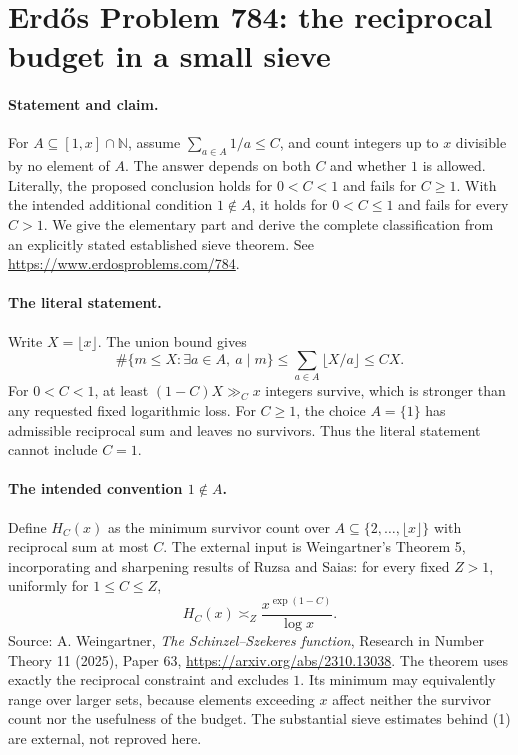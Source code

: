 \section*{Erd\H{o}s Problem 784: the reciprocal budget in a small sieve}

\paragraph{Statement and claim.}
For \(A\subseteq[1,x]\cap\mathbb N\), assume
\(\sum_{a\in A}1/a\leq C\), and count integers up to \(x\)
divisible by no element of \(A\).
The answer depends on both \(C\) and whether \(1\) is allowed.
Literally, the proposed conclusion holds for \(0<C<1\) and
fails for \(C\geq1\).
With the intended additional condition \(1\notin A\), it holds
for \(0<C\leq1\) and fails for every \(C>1\).
We give the elementary part and derive the complete classification
from an explicitly stated established sieve theorem.
See \url{https://www.erdosproblems.com/784}.

\paragraph{The literal statement.}
Write \(X=\lfloor x\rfloor\). The union bound gives
\[
 \#\{m\leq X:\exists a\in A,\ a\mid m\}
 \leq\sum_{a\in A}\lfloor X/a\rfloor\leq CX.
\]
For \(0<C<1\), at least \((1-C)X\gg_C x\) integers survive,
which is stronger than any requested fixed logarithmic loss.
For \(C\geq1\), the choice \(A=\{1\}\) has admissible reciprocal
sum and leaves no survivors. Thus the literal statement
cannot include \(C=1\).

\paragraph{The intended convention \(1\notin A\).}
Define \(H_C(x)\) as the minimum survivor count over
\(A\subseteq\{2,\ldots,\lfloor x\rfloor\}\) with reciprocal
sum at most \(C\).
The external input is Weingartner's Theorem 5, incorporating
and sharpening results of Ruzsa and Saias:
for every fixed \(Z>1\), uniformly for \(1\leq C\leq Z\),
\[
 H_C(x)\asymp_Z\frac{x^{\exp(1-C)}}{\log x}.                    \tag{1}
\]
Source: A. Weingartner, \emph{The Schinzel--Szekeres function},
Research in Number Theory 11 (2025), Paper 63,
\url{https://arxiv.org/abs/2310.13038}.
The theorem uses exactly the reciprocal constraint and
excludes \(1\). Its minimum may equivalently range over
larger sets, because elements exceeding \(x\) affect neither
the survivor count nor the usefulness of the budget.
The substantial sieve estimates behind (1) are external,
not reproved here.

